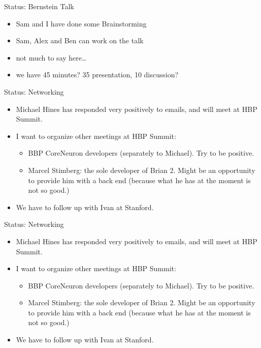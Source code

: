 \documentclass[aspectratio=43]{beamer}
\begin{document}
\begin{frame}{Status: Bernstein Talk}
    \begin{itemize}
        \item   Sam and I have done some Brainstorming
        \item   Sam, Alex and Ben can work on the talk
        \item   not much to say here\dots
        \item   we have 45 minutes? 35 presentation, 10 discussion?
    \end{itemize}
\end{frame}

\begin{frame}{Status: Networking}
    \begin{itemize}
        \item   Michael Hines has responded very positively to emails, and will meet at HBP Summit.
        \item   I want to organize other meetings at HBP Summit:
        \begin{itemize}
            \item   BBP CoreNeuron developers (separately to Michael). Try to be positive.
            \item   Marcel Stimberg: the sole developer of Brian 2. Might be an opportunity to provide him with a back end (because what he has at the moment is not so good.)
        \end{itemize}
        \item   We have to follow up with Ivan at Stanford.
    \end{itemize}
\end{frame}

\begin{frame}{Status: Networking}
    \begin{itemize}
        \item   Michael Hines has responded very positively to emails, and will meet at HBP Summit.
        \item   I want to organize other meetings at HBP Summit:
        \begin{itemize}
            \item   BBP CoreNeuron developers (separately to Michael). Try to be positive.
            \item   Marcel Stimberg: the sole developer of Brian 2. Might be an opportunity to provide him with a back end (because what he has at the moment is not so good.)
        \end{itemize}
        \item   We have to follow up with Ivan at Stanford.
    \end{itemize}
\end{frame}

\end{document}
